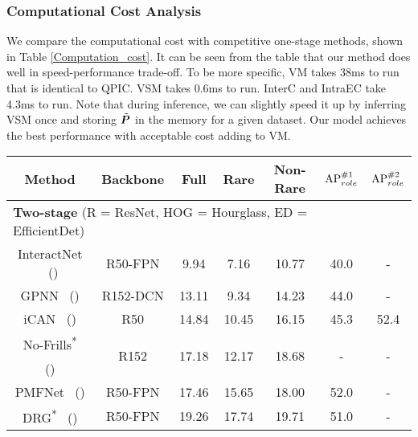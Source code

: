 \documentclass[letterpaper]{article} %
\begin{document}
\subsubsection{Computational Cost Analysis} We compare the computational cost with competitive one-stage methods, shown in Table \ref{Computation_cost}. It can be seen from the table that our method does well in speed-performance trade-off. To be more specific, VM takes 38ms to run that is identical to QPIC. VSM takes 0.6ms to run. InterC and IntraEC take 4.3ms to run. Note that during inference, we can slightly speed it up by inferring VSM once and storing $\Tilde{\bm{P}}$ in the memory for a given dataset. Our model achieves the best performance with acceptable cost adding to VM. 



\begin{table}[t]
  \scriptsize
  \setlength{\tabcolsep}{1pt}
  \centering
    \begin{tabular}{ccccc|cc}
    \Xhline{1.0pt}
    \textbf{Method} & \textbf{Backbone} & \textbf{Full} & \textbf{Rare} & {\tiny \textbf{Non-Rare}} & {\tiny ${\rm AP}_{role}^{\#1}$} & {\tiny ${\rm AP}_{role}^{\#2}$} \\
    \hline
    \hline
    \multicolumn{5}{l}{\textbf{Two-stage} \quad (R = ResNet, HOG = Hourglass, ED = EfficientDet)} \\
    \hline
    InteractNet \ (\citeauthor{kaiming18DetectHOI}) & R50-FPN & 9.94  & 7.16  & 10.77 & 40.0 & - \\
    GPNN \ (\citeauthor{Qi2018GPNN}) & R152-DCN & 13.11  & 9.34  & 14.23 & 44.0 & - \\
    iCAN \ (\citeauthor{gao2018ican}) & R50 & 14.84  & 10.45  & 16.15 & 45.3 & 52.4 \\
    No-Frills\textsuperscript{*} & \multirow{2}[2]{*}{R152} & \multirow{2}[2]{*}{17.18} & \multirow{2}[2]{*}{12.17} & \multirow{2}[2]{*}{18.68} & \multirow{2}[2]{*}{-} & \multirow{2}[2]{*}{-} \\
    {\tiny (\citeauthor{gupta2019nofrills})}  &       &       &       &       &       &  \\
    PMFNet \ (\citeauthor{wan2019PMFNet}) & R50-FPN & 17.46  & 15.65  & 18.00 & 52.0 & - \\
    DRG\textsuperscript{*} \ (\citeauthor{gao2020DRG})  & R50-FPN & 19.26  & 17.74  & 19.71 & 51.0 & - \\

\end{tabular}
\end{table}
\end{document}
